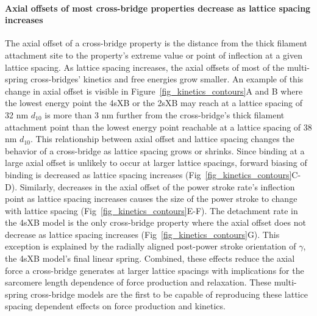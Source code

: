 \documentclass[10pt]{article}
\begin{document}
\paragraph{Axial offsets of most cross-bridge properties decrease as lattice spacing increases} %
The axial offset of a cross-bridge property is the distance from the thick filament attachment site to the property's extreme value or point of inflection at a given lattice spacing. 
As lattice spacing increases, the axial offsets of most of the multi-spring cross-bridges' kinetics and free energies grow smaller.
An example of this change in axial offset is visible in Figure~\ref{fig_kinetics_contours}A and B where the lowest energy point the 4sXB or the 2sXB may reach at a lattice spacing of 32 nm $d_{10}$ is more than 3 nm further from the cross-bridge's thick filament attachment point than the lowest energy point reachable at a lattice spacing of 38 nm $d_{10}$. 
This relationship between axial offset and lattice spacing changes the behavior of a cross-bridge as lattice spacing grows or shrinks.
Since binding at a large axial offset is unlikely to occur at larger lattice spacings, forward biasing of binding is decreased as lattice spacing increases (Fig~\ref{fig_kinetics_contours}C-D). 
Similarly, decreases in the axial offset of the power stroke rate's inflection point as lattice spacing increases causes the size of the power stroke to change with lattice spacing (Fig~\ref{fig_kinetics_contours}E-F).
The detachment rate in the 4sXB model is the only cross-bridge property where the axial offset does not decrease as lattice spacing increases (Fig~\ref{fig_kinetics_contours}G). 
This exception is explained by the radially aligned post-power stroke orientation of $\gamma$, the 4sXB model's final linear spring. 
Combined, these effects reduce the axial force a cross-bridge generates at larger lattice spacings with implications for the sarcomere length dependence of force production and relaxation. 
These multi-spring cross-bridge models are the first to be capable of reproducing these lattice spacing dependent effects on force production and kinetics.
\end{document}
